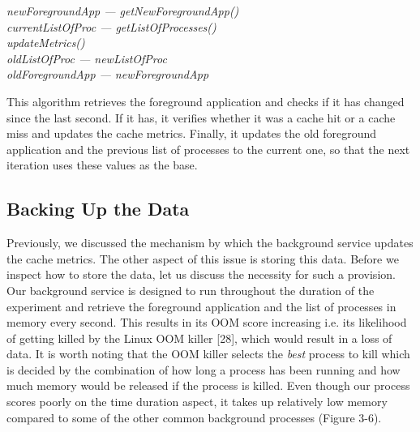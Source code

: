 \documentclass[12pt]{uthesis-v12}  %
\begin{document}
		 	\begin{algorithm}[H]
		 		\SetAlgoLined
		 				 		
		 		{	
		 			{\em newForegroundApp --- getNewForegroundApp()}\\
		 			{\em currentListOfProc --- getListOfProcesses()}\\	 			
		 			{\em updateMetrics()}\\
		 			{\em oldListOfProc --- newListOfProc}\\
		 			{\em oldForegroundApp --- newForegroundApp}		 			
		 		}
		 		
		 		\caption[Algorithm to update cache metrics]{This algorithm retrieves the foreground application and checks if it has changed since the last second. If it has, it verifies whether it was a cache hit or a cache miss and updates the cache metrics. Finally, it updates the old foreground application and the previous list of processes to the current one, so that the next iteration uses these values as the base.}
		 	\end{algorithm}

		\subsection{Backing Up the Data}
			Previously, we discussed the mechanism by which the background service updates the cache metrics. The other aspect of this issue is storing this data. Before we inspect how to store the data, let us discuss the necessity for such a provision. Our background service is designed to run throughout the duration of the experiment and retrieve the foreground application and the list of processes in memory every second. This results in its OOM score increasing i.e. its likelihood of getting killed by the Linux OOM killer [28], which would result in a loss of data. It is worth noting that the OOM killer selects the {\em best} process to kill which is decided by the combination of how long a process has been running and how much memory would be released if the process is killed. Even though our process scores poorly on the time duration aspect, it takes up relatively low memory compared to some of the other common background processes (Figure 3-6).
\end{document}
